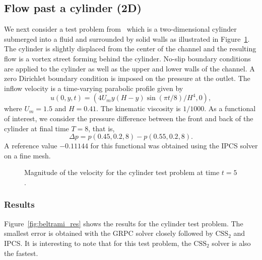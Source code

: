 \subsection{Flow past a cylinder (2D)}

We next consider a test problem from~\cite{turek} which is a
two-dimensional cylinder submerged into a fluid and surrounded by
solid walls as illustrated in
Figure~\ref{fig:cylinder_illustration}. The cylinder is slightly
displaced from the center of the channel and the resulting flow is a
vortex street forming behind the cylinder. No-slip boundary conditions
are applied to the cylinder as well as the upper and lower walls of
the channel. A zero Dirichlet boundary condition is imposed on the
pressure at the outlet. The inflow velocity is a time-varying
parabolic profile given by
\begin{equation} \label{eq:cyl_inflow}
  u(0, y, t) = (4 U_m y (H - y) \sin(\pi t/8)/H^{4}, 0),
\end{equation}
where $U_m = 1.5$ and $H = 0.41$. The kinematic viscosity is $1/1000$.
As a functional of interest, we consider the pressure difference
between the front and back of the cylinder at final time $T = 8$, that
is,
\begin{equation}\label{eq:dp}
  \Delta p = p(0.45, 0.2, 8) - p(0.55, 0.2, 8).
\end{equation}
A reference value $-0.11144$ for this functional was obtained using
the IPCS solver on a fine mesh.

\begin{figure}
  \begin{center}
    \caption{Magnitude of the velocity for the cylinder test problem at
      time $t = 5$.}
    \label{fig:cylinder_illustration}
  \end{center}
\end{figure}

\subsubsection{Results}

Figure~\ref{fig:beltrami_res} shows the results for the cylinder test
problem. The smallest error is obtained with the GRPC solver closely
followed by $\mathrm{CSS}_2$ and IPCS. It is interesting to note that
for this test problem, the $\mathrm{CSS}_2$ solver is also the
fastest.

